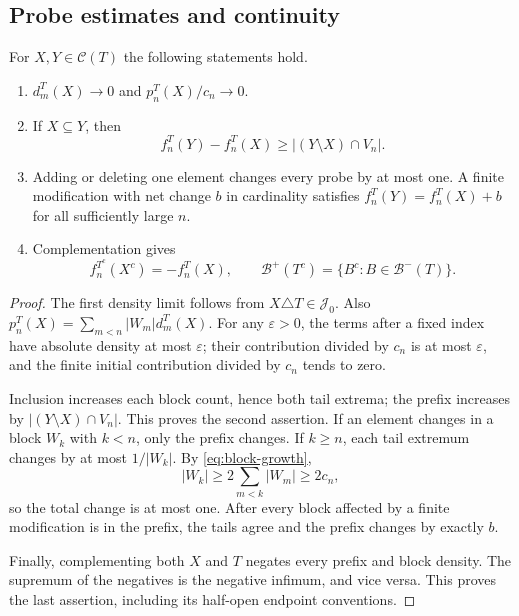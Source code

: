 \subsection{Probe estimates and continuity}

\begin{lemma}\label{lem:probe-properties}
For $X,Y\in\mathcal C(T)$ the following statements hold.
\begin{enumerate}
\item $d_m^T(X)\to0$ and $p_n^T(X)/c_n\to0$.
\item If $X\subseteq Y$, then
\begin{equation}\label{eq:probe-monotone}
 f_n^T(Y)-f_n^T(X)\ge |(Y\setminus X)\cap V_n|.
\end{equation}
\item Adding or deleting one element changes every probe by at most
one. A finite modification with net change $b$ in cardinality satisfies
$f_n^T(Y)=f_n^T(X)+b$ for all sufficiently large $n$.
\item Complementation gives
\[
 f_n^{T^c}(X^c)=-f_n^T(X),\qquad
 \mathcal B^+(T^c)=\{B^c:B\in\mathcal B^-(T)\}.
\]
\end{enumerate}
\end{lemma}

\begin{proof}
The first density limit follows from $X\triangle T\in\mathcal J_0$.
Also $p_n^T(X)=\sum_{m<n}|W_m|d_m^T(X)$. For any $\varepsilon>0$,
the terms after a fixed index have absolute density at most
$\varepsilon$; their contribution divided by $c_n$ is at most
$\varepsilon$, and the finite initial contribution divided by $c_n$
tends to zero.

Inclusion increases each block count, hence both tail extrema; the
prefix increases by $|(Y\setminus X)\cap V_n|$. This proves the second
assertion. If an element changes in a block $W_k$ with $k<n$, only the
prefix changes. If $k\ge n$, each tail extremum changes by at most
$1/|W_k|$. By \eqref{eq:block-growth},
\[
 |W_k|\ge 2\sum_{m<k}|W_m|\ge 2c_n,
\]
so the total change is at most one. After every block affected by a
finite modification is in the prefix, the tails agree and the prefix
changes by exactly $b$.

Finally, complementing both $X$ and $T$ negates every prefix and block
density. The supremum of the negatives is the negative infimum, and
vice versa. This proves the last assertion, including its half-open
endpoint conventions.
\end{proof}


